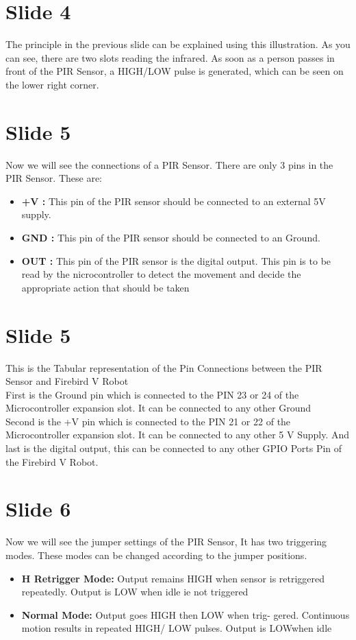 \documentclass[a4paper,12 pt]{article}
\begin{document}
\section{Slide 4}
The principle in the previous slide can be explained using this illustration.
As you can see, there are two slots reading the infrared. As soon as a person passes in front of the PIR Sensor, a HIGH/LOW pulse is generated, which can be seen on the lower right corner.




\section{Slide 5}
Now we will see the connections of a PIR Sensor.
There are only 3 pins in the PIR Sensor. These are:\\
\begin{itemize}

\item \textbf{+V :} This pin of the PIR sensor should be connected to an
external 5V supply.
\item \textbf{GND :} This pin of the PIR sensor should be connected to an
Ground.
\item \textbf{OUT :} This pin of the PIR sensor is the digital output. This pin
is to be read by the nicrocontroller to detect the movement and
decide the appropriate action that should be taken
\end{itemize}


\section{Slide 5}
This is the Tabular representation of the Pin Connections between the PIR Sensor and Firebird V Robot\\

First is the Ground pin which is connected to the PIN 23 or 24 of the Microcontroller expansion slot. It can be connected to any other Ground\\
Second is the +V pin which is connected to the PIN 21 or 22 of the Microcontroller expansion slot. It can be connected to any other 5 V Supply.
And last is the digital output, this can be connected to any other GPIO Ports Pin of the Firebird V Robot.


\section{Slide 6}
Now we will see the jumper settings of the PIR Sensor,
It has two triggering modes. These modes can be changed according to the jumper positions.
			\begin{itemize}

\item \textbf{H Retrigger Mode:} Output remains HIGH when sensor is retriggered repeatedly. Output is LOW when idle ie not triggered
\item \textbf{Normal Mode: }Output goes HIGH then LOW when trig-
gered. Continuous motion results in repeated HIGH/ LOW
pulses. Output is LOWwhen idle
\end{itemize}
\end{document}
